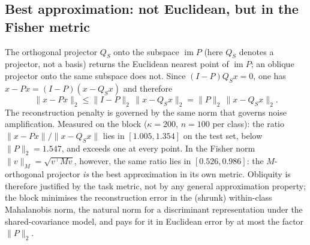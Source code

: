 \documentclass[11pt,a4paper]{article}
\theoremstyle{plain}
\theoremstyle{definition}
\theoremstyle{remark}
\newcommand{\im}{\operatorname{im}}
\newcommand{\T}{\top}
\begin{document}
\subsection{Best approximation: not Euclidean, but in the Fisher metric}
The orthogonal projector $Q_S$ onto the subspace $\im P$ (here $Q_S$ denotes
a projector, not a basis) returns the Euclidean nearest point of $\im P$; an
oblique projector onto the same subspace does not. Since
$(I-P)Q_Sx=0$, one has $x-Px=(I-P)(x-Q_Sx)$ and therefore
\begin{equation}
  \|x-Px\|_2\le\|I-P\|_2\,\|x-Q_Sx\|_2=\|P\|_2\,\|x-Q_Sx\|_2 .
  \label{eq:best-approx}
\end{equation}
The reconstruction penalty is governed by the same norm that governs noise
amplification. Measured on the block ($\kappa=200$, $n=100$ per class): the
ratio $\|x-Px\|/\|x-Q_Sx\|$ lies in $[1.005,1.354]$ on the test set, below
$\|P\|_2=1.547$, and exceeds one at every point. In the Fisher norm
$\|v\|_M=\sqrt{v^\T Mv}$, however, the same ratio lies in $[0.526,0.986]$:
the $M$-orthogonal projector \emph{is} the best approximation in its own
metric. Obliquity is therefore justified by the task metric, not by any
general approximation property; the block minimises the reconstruction
error in the (shrunk) within-class Mahalanobis norm, the natural norm for a
discriminant representation under the shared-covariance model, and pays for
it in Euclidean error by at most the factor $\|P\|_2$.
\end{document}

